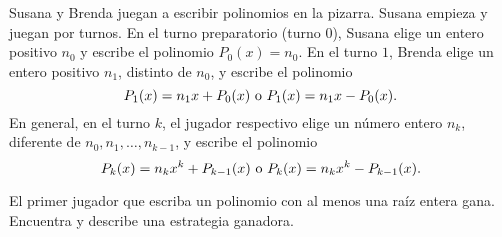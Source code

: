 Susana y Brenda juegan a escribir polinomios en la pizarra. Susana empieza y juegan por turnos.
 En el turno preparatorio (turno $0$), Susana elige un entero positivo $n_0$ y escribe el polinomio $P_0(x)=n_0$. En el turno $1$, Brenda elige un entero positivo $n_1$, distinto de $n_0$, y escribe el polinomio
\[ P_1(x)=n_1x+P_0(x) \textup{ o } P_1(x)=n_1x-P_0(x). \]
En general, en el turno $k$, el jugador respectivo elige un número entero $n_k$, diferente de $n_0, n_1, \ldots, n_{k-1}$, y escribe el polinomio
\[P_k(x)=n_kx^k+P_{k-1}(x) \textup{ o } P_k(x)=n_kx^k-P_{k-1}(x).\]

El primer jugador que escriba un polinomio con al menos una raíz entera gana. Encuentra y describe una estrategia ganadora.
